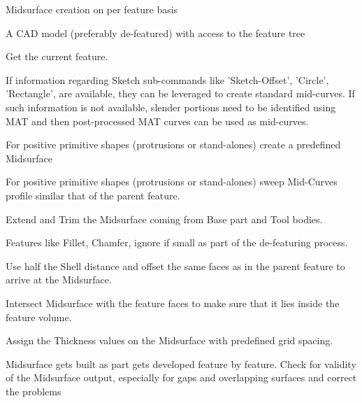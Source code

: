 \begin{algorithm}

	\caption{Midsurface creation on per feature basis }

	\label{alg2}

	\begin{algorithmic}

		\REQUIRE A CAD model (preferably de-featured) with access to the feature tree


			\STATE Get the current feature.

				\STATE  If information regarding Sketch sub-commands like 'Sketch-Offset', 'Circle', 'Rectangle', are available, they can be leveraged to create standard mid-curves. 
				\STATE If such information is not available, slender portions need to be identified using MAT and then post-processed MAT curves can be used as mid-curves.
			\ENDIF

				\STATE  For positive primitive shapes (protrusions or stand-alones) create a predefined Midsurface
			\ENDIF

				\STATE For positive primitive shapes (protrusions or stand-alones) sweep Mid-Curves profile similar that of the parent feature.
			\ENDIF

				\STATE Extend and Trim the Midsurface coming from Base part and Tool bodies.
			\ENDIF

				\STATE Features like Fillet, Chamfer, ignore if small as part of the de-featuring process.
			\ENDIF

				\STATE  Use half the Shell distance and offset the same faces as in the parent feature to arrive at the Midsurface.
			\ENDIF

			\STATE Intersect Midsurface with the feature faces to make sure that it lies inside the feature volume.

			\STATE Assign the Thickness values on the Midsurface with predefined grid spacing.

		\ENDWHILE
		\STATE Midsurface gets built as part gets developed feature by feature.
		\STATE Check for validity of the Midsurface output, especially for gaps and overlapping surfaces and correct the problems

	\end{algorithmic}

\end{algorithm}

